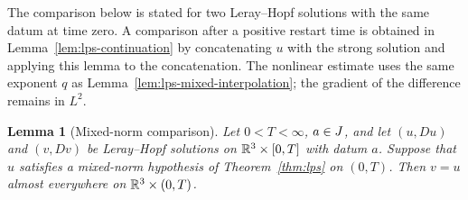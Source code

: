 \documentclass[11pt,letterpaper]{article}
\numberwithin{equation}{section}
\theoremstyle{plain}
\newtheorem{lemma}[theorem]{Lemma}
\theoremstyle{definition}
\theoremstyle{remark}
\begin{document}
The comparison below is stated for two Leray--Hopf solutions with the same
datum at time zero. A comparison after a positive restart time is obtained in
Lemma~\ref{lem:lps-continuation} by concatenating $u$ with the strong
solution and applying this lemma to the concatenation. The nonlinear estimate
uses the same exponent $q$ as Lemma~\ref{lem:lps-mixed-interpolation};
the gradient of the difference remains in $L^2$.

\begin{lemma}[Mixed-norm comparison]\label{lem:lps-comparison}
Let $0<T<\infty$, $a\in J$, and let $(u,Du)$ and $(v,Dv)$ be Leray--Hopf
solutions on $\mathbb{R}^3\times[0,T]$ with datum $a$. Suppose that $u$ satisfies a
mixed-norm hypothesis of Theorem~\ref{thm:lps} on $(0,T)$. Then $v=u$
almost everywhere on $\mathbb{R}^3\times(0,T)$.
\end{lemma}
\end{document}
